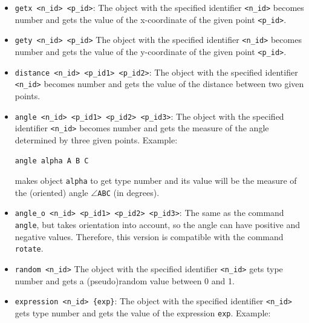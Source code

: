 \documentclass[a4paper]{book}
\begin{document}
\begin{itemize}
\item \verb|getx <n_id> <p_id>|:
        The object with the specified identifier \verb|<n_id>| becomes
        {\sc number} and gets the value of the x-coordinate of the
        given point \verb|<p_id>|.

\item \verb|gety <n_id> <p_id>|
        The object with the specified identifier \verb|<n_id>| becomes
        {\sc number} and gets the value of the y-coordinate of the
        given point \verb|<p_id>|.

\item \verb|distance <n_id> <p_id1> <p_id2>|:
        The object with the specified identifier \verb|<n_id>| becomes {\sc number}
        and gets the value of the distance between two given points.

\item \verb|angle <n_id> <p_id1> <p_id2> <p_id3>|:
        The object with the specified identifier \verb|<n_id>| becomes {\sc number}
        and gets the measure of the angle determined by three given points.
        Example:

        \verb|angle alpha A B C|

        makes object \verb|alpha| to get type {\sc number} and its value will
        be the measure of the (oriented) angle $\angle$\verb|ABC| (in degrees).

\item \verb|angle_o <n_id> <p_id1> <p_id2> <p_id3>|:
        The same as the command \verb|angle|, but takes orientation into
        account, so the angle can have positive and negative values.
        Therefore, this version is compatible with the command \verb|rotate|.

\item \verb|random <n_id>|
        The object with the specified identifier \verb|<n_id>| gets type {\sc number}
        and gets a (pseudo)random value between 0 and 1.

\item \verb|expression <n_id> {exp}|:
        The object with the specified identifier \verb|<n_id>| gets type {\sc number}
        and gets the value of the expression \verb|exp|.
        Example:


\end{itemize}
\end{document}
